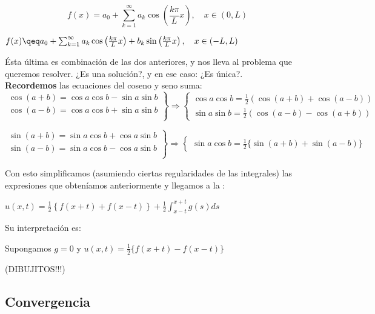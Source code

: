 		\[ f(x) = a_0 + \sum^{\infty}_{k=1} a_k \cos \left( \frac{k \pi}{L} x \right), \quad x \in (0,L) \]

		\(
		f(x) \qeq a_0 + \sum^{\infty}_{k=1} a_k \cos \left( \frac{k \pi}{L} x \right) + b_k \sin \left( \frac{k \pi}{L} x \right), \quad x \in (-L,L)
		\)

		Ésta última es combinación de las dos anteriores, y nos lleva al problema que queremos resolver. ¿Es una solución?, y en ese caso: ¿Es única?.\\

		\textbf{Recordemos} las ecuaciones del coseno y seno suma:
		\[
		\left. \begin{array}{r}
			\cos (a + b) = \cos a \cos b - \sin a \sin b \\
			\cos (a - b) = \cos a \cos b + \sin a \sin b \\
		\end{array} \right\} \Rightarrow \left\{ \begin{array}{l}
			\cos a \cos b = \frac{1}{2} (\cos (a+b) + \cos (a-b)) \\
			\sin a \sin b = \frac{1}{2} (\cos (a-b) - \cos (a+b))
		\end{array} \right.
		\]

		\[
		\left. \begin{array}{r}
			\sin (a + b) = \sin a \cos b + \cos a \sin b \\
			\sin (a - b) = \sin a \cos b - \cos a \sin b \\
		\end{array} \right\} \Rightarrow \left\{ \begin{array}{l}
			\sin a \cos b = \frac{1}{2} \{\sin (a+b) + \sin(a-b)\}
		\end{array} \right.
		\]

		Con esto simplificamos (asumiendo ciertas regularidades de las integrales) las expresiones que obteníamos anteriormente y llegamos a la :

		\(
		u(x,t) = \frac{1}{2} \left\{ f(x+t) + f(x-t) \right\} + \frac{1}{2} \int^{x+t}_{x-t} g(s) ds  \label{eq:DALEMBERT}\)

		Su interpretación es:

		Supongamos $g=0$ y $u(x,t) = \frac{1}{2} \{ f(x+t) - f(x-t)\} $

		(DIBUJITOS!!!)

	\subsection{Convergencia}

